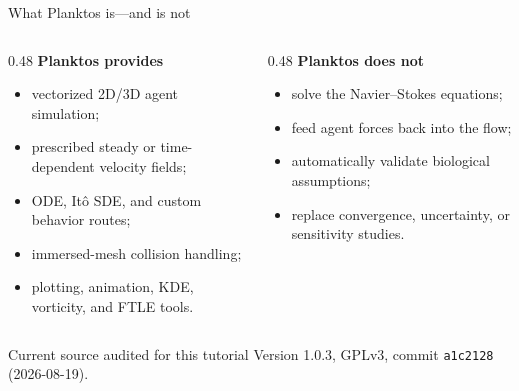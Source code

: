 \documentclass[aspectratio=169,11pt]{beamer}
\newcommand{\code}[1]{\texttt{#1}}
\begin{document}
\begin{frame}{What Planktos is---and is not}
\begin{columns}[T,onlytextwidth]
  \begin{column}{0.48\textwidth}
    \textbf{Planktos provides}
    \begin{itemize}
      \item vectorized 2D/3D agent simulation;
      \item prescribed steady or time-dependent velocity fields;
      \item ODE, It\^o SDE, and custom behavior routes;
      \item immersed-mesh collision handling;
      \item plotting, animation, KDE, vorticity, and FTLE tools.
    \end{itemize}
  \end{column}
  \begin{column}{0.48\textwidth}
    \textbf{Planktos does not}
    \begin{itemize}
      \item solve the Navier--Stokes equations;
      \item feed agent forces back into the flow;
      \item automatically validate biological assumptions;
      \item replace convergence, uncertainty, or sensitivity studies.
    \end{itemize}
  \end{column}
\end{columns}
\begin{block}{Current source audited for this tutorial}
Version 1.0.3, GPLv3, commit \code{a1c2128} (2026-08-19).
\end{block}
\end{frame}
\end{document}
